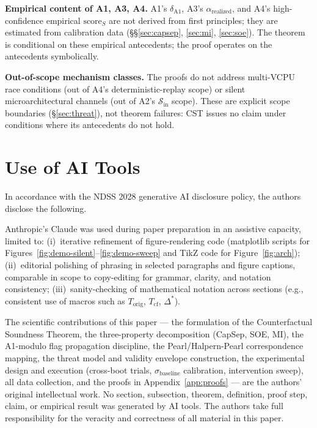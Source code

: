 \documentclass[conference]{IEEEtran}
\newcommand{\Korig}{T_\text{orig}}
\newcommand{\Tcf}{T_\text{cf}}
\newcommand{\sigbase}{\hat{\sigma}_\text{baseline}}
\newcommand{\Dstar}{\Delta^{*}}
\newcommand{\arealized}{\alpha_\text{realized}}
\newcommand{\scoreS}{\text{score}_S}
\begin{document}
\textbf{Empirical content of A1, A3, A4.} A1's
$\delta_{\text{A1}}$, A3's $\arealized$, and A4's
high-confidence empirical $\scoreS$ are not derived from first
principles; they are estimated from calibration data
(\S\S\ref{sec:capsep}, \ref{sec:mi}, \ref{sec:soe}). The theorem
is conditional on these empirical antecedents; the proof
operates on the antecedents symbolically.

\textbf{Out-of-scope mechanism classes.} The proofs do not address
multi-VCPU race conditions (out of A4's deterministic-replay
scope) or silent microarchitectural channels (out of A2's
$\mathcal{S}_\text{in}$ scope). These are explicit scope
boundaries (\S\ref{sec:threat}), not theorem failures: CST
issues no claim under conditions where its antecedents do not
hold.

\section{Use of AI Tools}\label{app:ai-disclosure}

In accordance with the NDSS 2028 generative AI disclosure
policy, the authors disclose the following.

Anthropic's Claude was used during paper preparation in an
assistive capacity, limited to: (i)~iterative refinement of
figure-rendering code (matplotlib scripts for
Figures~\ref{fig:demo-silent}--\ref{fig:demo-sweep} and TikZ
code for Figure~\ref{fig:arch}); (ii)~editorial polishing of
phrasing in selected paragraphs and figure captions, comparable
in scope to copy-editing for grammar, clarity, and notation
consistency; (iii)~sanity-checking of mathematical notation
across sections (e.g., consistent use of macros such as
$\Korig$, $\Tcf$, $\Dstar$).

The scientific contributions of this paper --- the formulation
of the Counterfactual Soundness Theorem, the three-property
decomposition (CapSep, SOE, MI), the A1-modulo flag
propagation discipline, the Pearl/Halpern-Pearl correspondence
mapping, the threat model and validity envelope construction,
the experimental design and execution (cross-boot trials,
$\sigbase$ calibration, intervention sweep), all data
collection, and the proofs in Appendix~\ref{app:proofs} ---
are the authors' original intellectual work. No section,
subsection, theorem, definition, proof step, claim, or
empirical result was generated by AI tools. The authors take
full responsibility for the veracity and correctness of all
material in this paper.

\ifzenodo
\end{document}
